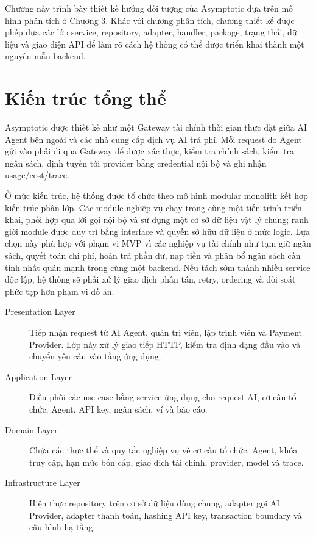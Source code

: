 
Chương này trình bày thiết kế hướng đối tượng của Asymptotic dựa trên mô hình phân tích ở Chương 3. Khác với chương phân tích, chương thiết kế được phép đưa các lớp service, repository, adapter, handler, package, trạng thái, dữ liệu và giao diện API để làm rõ cách hệ thống có thể được triển khai thành một nguyên mẫu backend.

\section{Kiến trúc tổng thể}

Asymptotic được thiết kế như một Gateway tài chính thời gian thực đặt giữa AI Agent bên ngoài và các nhà cung cấp dịch vụ AI trả phí. Mỗi request do Agent gửi vào phải đi qua Gateway để được xác thực, kiểm tra chính sách, kiểm tra ngân sách, định tuyến tới provider bằng credential nội bộ và ghi nhận usage/cost/trace.

Ở mức kiến trúc, hệ thống được tổ chức theo mô hình modular monolith kết hợp kiến trúc phân lớp. Các module nghiệp vụ chạy trong cùng một tiến trình triển khai, phối hợp qua lời gọi nội bộ và sử dụng một cơ sở dữ liệu vật lý chung; ranh giới module được duy trì bằng interface và quyền sở hữu dữ liệu ở mức logic. Lựa chọn này phù hợp với phạm vi MVP vì các nghiệp vụ tài chính như tạm giữ ngân sách, quyết toán chi phí, hoàn trả phần dư, nạp tiền và phân bổ ngân sách cần tính nhất quán mạnh trong cùng một backend. Nếu tách sớm thành nhiều service độc lập, hệ thống sẽ phải xử lý giao dịch phân tán, retry, ordering và đối soát phức tạp hơn phạm vi đồ án.

\begin{description}
    \item[Presentation Layer] Tiếp nhận request từ AI Agent, quản trị viên, lập trình viên và Payment Provider. Lớp này xử lý giao tiếp HTTP, kiểm tra định dạng đầu vào và chuyển yêu cầu vào tầng ứng dụng.
    \item[Application Layer] Điều phối các use case bằng service ứng dụng cho request AI, cơ cấu tổ chức, Agent, API key, ngân sách, ví và báo cáo.
    \item[Domain Layer] Chứa các thực thể và quy tắc nghiệp vụ về cơ cấu tổ chức, Agent, khóa truy cập, hạn mức bốn cấp, giao dịch tài chính, provider, model và trace.
    \item[Infrastructure Layer] Hiện thực repository trên cơ sở dữ liệu dùng chung, adapter gọi AI Provider, adapter thanh toán, hashing API key, transaction boundary và cấu hình hạ tầng.
\end{description}

